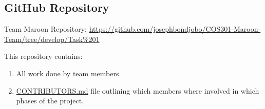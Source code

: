 \documentclass[a4paper,10pt]{article}
\begin{document}
\subsection {GitHub Repository}
Team Maroon Repository: \url{https://github.com/josephbondjobo/COS301-Maroon-Team/tree/develop/Task%201}

This repository contains:
\begin{enumerate}
\item All work done by team members.
\item \href{https://github.com/josephbondjobo/COS301-Maroon-Team/blob/develop/Intro/Contributors.md}{CONTRIBUTORS.md} file outlining which members where involved in which phases of the project.
\end{enumerate}



\newpage
\clearpage
{}
\end{document}
